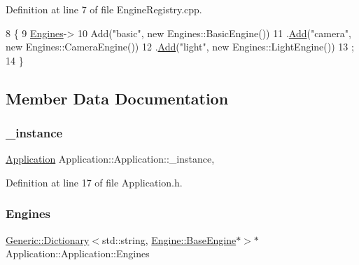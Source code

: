 Definition at line 7 of file Engine\+Registry.\+cpp.


\begin{DoxyCode}
8 \{
9     \mbox{\hyperlink{classApplication_1_1Application_a4f2808bddfc3f8fb2ed3a3fe0d4659ff}{Engines}}->
10          Add(\textcolor{stringliteral}{"basic"}, \textcolor{keyword}{new} Engines::BasicEngine())
11         .\mbox{\hyperlink{classGeneric_1_1Dictionary_ae7cb006f801b21c172e8fbac8794fa99}{Add}}(\textcolor{stringliteral}{"camera"}, \textcolor{keyword}{new} Engines::CameraEngine())
12         .\mbox{\hyperlink{classGeneric_1_1Dictionary_ae7cb006f801b21c172e8fbac8794fa99}{Add}}(\textcolor{stringliteral}{"light"}, \textcolor{keyword}{new} Engines::LightEngine())
13     ;
14 \}
\end{DoxyCode}


\subsection{Member Data Documentation}
\mbox{\label{classApplication_1_1Application_abd6690c71308921648b3b4da20d604d9}} 
\subsubsection{\texorpdfstring{\+\_\+instance}{\_instance}}
{\footnotesize\ttfamily \mbox{\hyperlink{classApplication_1_1Application}{Application}} Application\+::\+Application\+::\+\_\+instance\hspace{0.3cm}{\ttfamily [static]}, {\ttfamily [private]}}



Definition at line 17 of file Application.\+h.

\mbox{\label{classApplication_1_1Application_a4f2808bddfc3f8fb2ed3a3fe0d4659ff}} 
\subsubsection{\texorpdfstring{Engines}{Engines}}
{\footnotesize\ttfamily \mbox{\hyperlink{classGeneric_1_1Dictionary}{Generic\+::\+Dictionary}}$<$std\+::string, \mbox{\hyperlink{classEngine_1_1BaseEngine}{Engine\+::\+Base\+Engine}}$\ast$$>$$\ast$ Application\+::\+Application\+::\+Engines}



